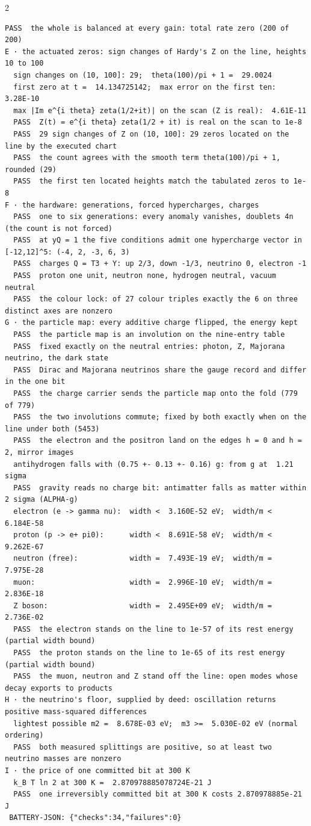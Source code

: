 \documentclass[10pt]{article}
\begin{document}
\begin{multicols}{2}
\begin{Verbatim}[fontsize=\fontsize{6.2}{7.2}\selectfont,breaklines,breakanywhere,breaksymbolleft={}]
  PASS  the whole is balanced at every gain: total rate zero (200 of 200)
E · the actuated zeros: sign changes of Hardy's Z on the line, heights 10 to 100
  sign changes on (10, 100]: 29;  theta(100)/pi + 1 =  29.0024
  first zero at t =  14.134725142;  max error on the first ten:  3.28E-10
  max |Im e^{i theta} zeta(1/2+it)| on the scan (Z is real):  4.61E-11
  PASS  Z(t) = e^{i theta} zeta(1/2 + it) is real on the scan to 1e-8
  PASS  29 sign changes of Z on (10, 100]: 29 zeros located on the line by the executed chart
  PASS  the count agrees with the smooth term theta(100)/pi + 1, rounded (29)
  PASS  the first ten located heights match the tabulated zeros to 1e-8
F · the hardware: generations, forced hypercharges, charges
  PASS  one to six generations: every anomaly vanishes, doublets 4n (the count is not forced)
  PASS  at yQ = 1 the five conditions admit one hypercharge vector in [-12,12]^5: (-4, 2, -3, 6, 3)
  PASS  charges Q = T3 + Y: up 2/3, down -1/3, neutrino 0, electron -1
  PASS  proton one unit, neutron none, hydrogen neutral, vacuum neutral
  PASS  the colour lock: of 27 colour triples exactly the 6 on three distinct axes are nonzero
G · the particle map: every additive charge flipped, the energy kept
  PASS  the particle map is an involution on the nine-entry table
  PASS  fixed exactly on the neutral entries: photon, Z, Majorana neutrino, the dark state
  PASS  Dirac and Majorana neutrinos share the gauge record and differ in the one bit
  PASS  the charge carrier sends the particle map onto the fold (779 of 779)
  PASS  the two involutions commute; fixed by both exactly when on the line under both (5453)
  PASS  the electron and the positron land on the edges h = 0 and h = 2, mirror images
  antihydrogen falls with (0.75 +- 0.13 +- 0.16) g: from g at  1.21 sigma
  PASS  gravity reads no charge bit: antimatter falls as matter within 2 sigma (ALPHA-g)
  electron (e -> gamma nu):  width <  3.160E-52 eV;  width/m <  6.184E-58
  proton (p -> e+ pi0):      width <  8.691E-58 eV;  width/m <  9.262E-67
  neutron (free):            width =  7.493E-19 eV;  width/m =  7.975E-28
  muon:                      width =  2.996E-10 eV;  width/m =  2.836E-18
  Z boson:                   width =  2.495E+09 eV;  width/m =  2.736E-02
  PASS  the electron stands on the line to 1e-57 of its rest energy (partial width bound)
  PASS  the proton stands on the line to 1e-65 of its rest energy (partial width bound)
  PASS  the muon, neutron and Z stand off the line: open modes whose decay exports to products
H · the neutrino's floor, supplied by deed: oscillation returns positive mass-squared differences
  lightest possible m2 =  8.678E-03 eV;  m3 >=  5.030E-02 eV (normal ordering)
  PASS  both measured splittings are positive, so at least two neutrino masses are nonzero
I · the price of one committed bit at 300 K
  k_B T ln 2 at 300 K =  2.870978885078724E-21 J
  PASS  one irreversibly committed bit at 300 K costs 2.870978885e-21 J
 BATTERY-JSON: {"checks":34,"failures":0}
\end{Verbatim}
\end{multicols}
\end{document}
